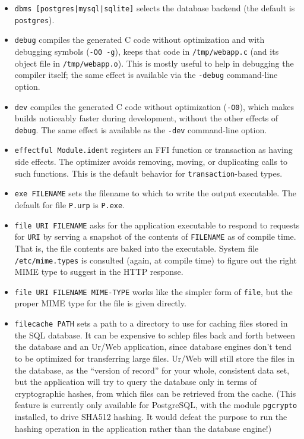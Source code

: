 \documentclass{article}
\begin{document}
\begin{itemize}
\item \texttt{dbms [postgres|mysql|sqlite]} selects the database backend (the default is \texttt{postgres}).
\item \texttt{debug} compiles the generated C code without optimization and with debugging symbols (\texttt{-O0 -g}), keeps that code in \texttt{/tmp/webapp.c} (and its object file in \texttt{/tmp/webapp.o}).  This is mostly useful to help in debugging the compiler itself; the same effect is available via the \texttt{-debug} command-line option.
\item \texttt{dev} compiles the generated C code without optimization (\texttt{-O0}), which makes builds noticeably faster during development, without the other effects of \texttt{debug}.  The same effect is available as the \texttt{-dev} command-line option.
\item \texttt{effectful Module.ident} registers an FFI function or transaction as having side effects.  The optimizer avoids removing, moving, or duplicating calls to such functions.  This is the default behavior for \texttt{transaction}-based types.
\item \texttt{exe FILENAME} sets the filename to which to write the output executable.  The default for file \texttt{P.urp} is \texttt{P.exe}.
\item \texttt{file URI FILENAME} asks for the application executable to respond to requests for \texttt{URI} by serving a snapshot of the contents of \texttt{FILENAME} as of compile time.  That is, the file contents are baked into the executable.  System file \texttt{/etc/mime.types} is consulted (again, at compile time) to figure out the right MIME type to suggest in the HTTP response.
\item \texttt{file URI FILENAME MIME-TYPE} works like the simpler form of \texttt{file}, but the proper MIME type for the file is given directly.
\item \texttt{filecache PATH} sets a path to a directory to use for caching files stored in the SQL database.  It can be expensive to schlep files back and forth between the database and an Ur/Web application, since database engines don't tend to be optimized for transferring large files.  Ur/Web will still store the files in the database, as the ``version of record'' for your whole, consistent data set, but the application will try to query the database only in terms of cryptographic hashes, from which files can be retrieved from the cache.  (This feature is currently only available for PostgreSQL, with the module \texttt{pgcrypto} installed, to drive SHA512 hashing.  It would defeat the purpose to run the hashing operation in the application rather than the database engine!)

\end{itemize}
\end{document}
